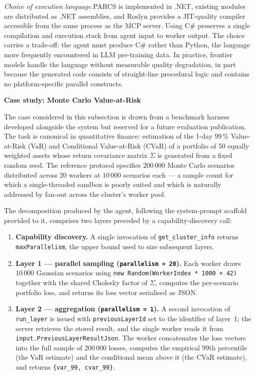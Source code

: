 \textit{Choice of execution language.}\quad PARCS is implemented in .NET, existing modules are distributed as .NET assemblies, and Roslyn provides a JIT-quality compiler accessible from the same process as the MCP server. Using C\# preserves a single compilation and execution stack from agent input to worker output. The choice carries a trade-off: the agent must produce C\# rather than Python, the language more frequently encountered in LLM pre-training data. In practice, frontier models handle the language without measurable quality degradation, in part because the generated code consists of straight-line procedural logic and contains no platform-specific parallel constructs.

\medskip\noindent\textbf{Case study: Monte Carlo Value-at-Risk}\par\nopagebreak
The case considered in this subsection is drawn from a benchmark harness developed alongside the system but reserved for a future evaluation publication. The task is canonical in quantitative finance: estimation of the 1-day 99\,\% Value-at-Risk (VaR) and Conditional Value-at-Risk (CVaR) of a portfolio of 50 equally weighted assets whose return covariance matrix $\Sigma$ is generated from a fixed random seed. The reference protocol specifies $200\,000$ Monte Carlo scenarios distributed across 20 workers at $10\,000$ scenarios each --- a sample count for which a single-threaded sandbox is poorly suited and which is naturally addressed by fan-out across the cluster's worker pool.

The decomposition produced by the agent, following the system-prompt scaffold provided to it, comprises two layers preceded by a capability-discovery call:

\begin{enumerate}[leftmargin=1.5cm,topsep=2pt,itemsep=2pt]
  \item \textbf{Capability discovery.} A single invocation of \texttt{get\_cluster\_info} returns \texttt{maxParallelism}, the upper bound used to size subsequent layers.
  \item \textbf{Layer 1 --- parallel sampling (\texttt{parallelism = 20}).} Each worker draws $10\,000$ Gaussian scenarios using \texttt{new Random(WorkerIndex * 1000 + 42)} together with the shared Cholesky factor of $\Sigma$, computes the per-scenario portfolio loss, and returns its loss vector serialised as JSON.
  \item \textbf{Layer 2 --- aggregation (\texttt{parallelism = 1}).} A second invocation of \texttt{run\_layer} is issued with \texttt{previousLayerId} set to the identifier of layer~1; the server retrieves the stored result, and the single worker reads it from \texttt{input.PreviousLayerResultJson}. The worker concatenates the loss vectors into the full sample of $200\,000$ losses, computes the empirical 99th percentile (the VaR estimate) and the conditional mean above it (the CVaR estimate), and returns \texttt{\{var\_99, cvar\_99\}}.
\end{enumerate}

